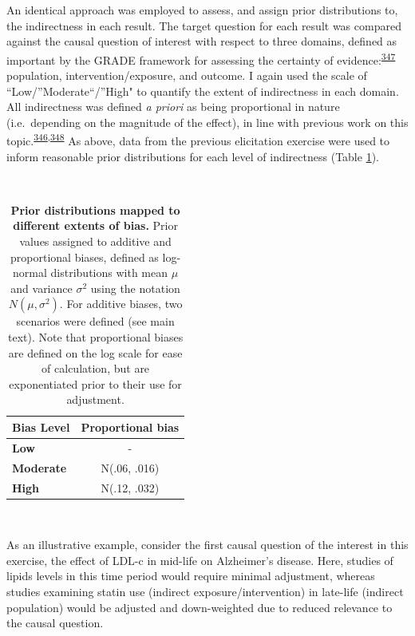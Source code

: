 \documentclass[a4paper, twoside]{templates/ociamthesis}
\begin{document}
An identical approach was employed to assess, and assign prior distributions to, the indirectness in each result. The target question for each result was compared against the causal question of interest with respect to three domains, defined as important by the GRADE framework for assessing the certainty of evidence:\textsuperscript{\protect\hyperlink{ref-guyatt2011}{347}} population, intervention/exposure, and outcome. I again used the scale of ``Low/''Moderate``/''High" to quantify the extent of indirectness in each domain. All indirectness was defined \emph{a priori} as being proportional in nature (i.e.~depending on the magnitude of the effect), in line with previous work on this topic.\textsuperscript{\protect\hyperlink{ref-turner2009}{346},\protect\hyperlink{ref-thompson2011}{348}} As above, data from the previous elicitation exercise were used to inform reasonable prior distributions for each level of indirectness (Table \ref{tab:priorsIndirect-table}).

~





\begin{table}[H]

\caption[Prior distributions mapped to different extents of bias.]{\label{tab:priorsIndirect-table}\textbf{Prior distributions mapped to different extents of bias.} Prior values assigned to additive and proportional biases, defined as log-normal distributions with mean \(\mu\) and variance \(\sigma^2\) using the notation \(N(\mu,\sigma^{2})\). For additive biases, two scenarios were defined (see main text). Note that proportional biases are defined on the log scale for ease of calculation, but are exponentiated prior to their use for adjustment.}
\centering
\begin{tabular}[t]{>{}lc}
\toprule
\textbf{Bias Level} & \textbf{Proportional bias}\\
\midrule
\textbf{Low} & -\\
\midrule
\textbf{Moderate} & N(.06, .016)\\
\midrule
\textbf{High} & N(.12, .032)\\
\bottomrule
\end{tabular}
\end{table}

~

As an illustrative example, consider the first causal question of the interest in this exercise, the effect of LDL-c in mid-life on Alzheimer's disease. Here, studies of lipids levels in this time period would require minimal adjustment, whereas studies examining statin use (indirect exposure/intervention) in late-life (indirect population) would be adjusted and down-weighted due to reduced relevance to the causal question.
\end{document}
